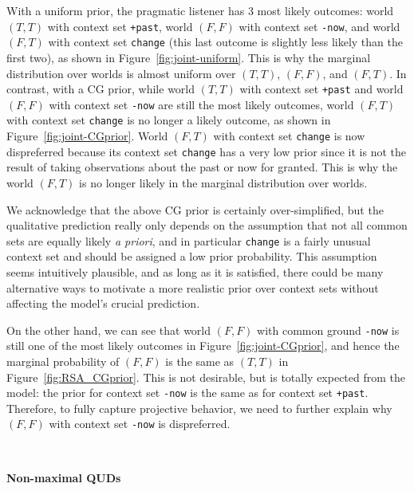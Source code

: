 With a uniform prior, the pragmatic listener has 3 most likely outcomes: 
 world $(T, T)$ with context set \verb=+past=, world $(F, F)$ with context set \verb=-now=, and world $(F, T)$ with context set \verb=change= (this last outcome
 is slightly less likely than the first two), as shown in Figure~\ref{fig:joint-uniform}.
This is why the marginal distribution over worlds is almost uniform over 
 $(T, T)$, $(F, F)$, and $(F, T)$.
In contrast, with a CG prior, while world $(T, T)$ with context set \verb=+past=
 and world $(F, F)$ with context set \verb=-now= are still the most likely outcomes,
 world $(F, T)$ with context set \verb=change= is no longer a likely outcome, 
 as shown in Figure~\ref{fig:joint-CGprior}.
World $(F, T)$ with context set \verb=change= is now dispreferred because 
 its context set \verb=change= has a very low prior since it is not the result 
 of taking observations about the past or now for granted.
This is why the world $(F, T)$ is no longer likely in the marginal distribution
 over worlds.

We acknowledge that the above CG prior is certainly over-simplified, 
 but the qualitative prediction really only depends on the 
 assumption that not all common sets are equally likely \emph{a priori}, and 
 in particular \verb=change= is a fairly unusual context set and 
 should be assigned a low prior probability.
This assumption seems intuitively plausible, and as long as it is satisfied, 
 there could be many alternative ways to motivate a more realistic prior over 
 context sets without affecting the model's crucial prediction.
 
On the other hand, we can see that world $(F, F)$ with common ground \verb=-now= 
 is still one of the most likely outcomes in Figure~\ref{fig:joint-CGprior}, and
 hence the marginal probability of $(F, F)$ is the same as $(T, T)$ in Figure~\ref{fig:RSA_CGprior}.
This is not desirable, but is totally expected from the model: 
 the prior for context set \verb=-now= is the same as for context set \verb=+past=. 
Therefore, to fully capture projective behavior, we need to further
 explain why $(F, F)$ with context set \verb=-now= is dispreferred.


\ 

\noindent\textbf{Non-maximal QUDs}

